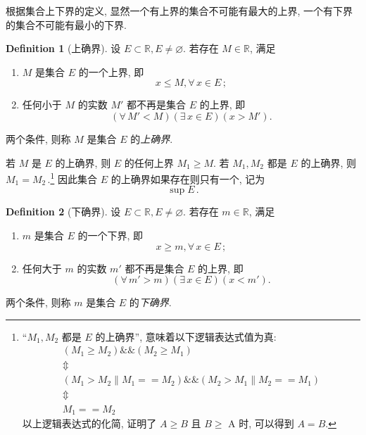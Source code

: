 \documentclass{book}
\renewcommand{\emptyset}{\varnothing}
\newcommand{\Exists}{\exists\,}
\newcommand{\Any}{\forall\,}
\numberwithin{equation}{section}
\numberwithin{figure}{section}
\theoremstyle{definition}
\newtheorem{definition}{Definition}
\newcommand{\dq}[1]{``#1''}
\begin{document}
根据集合上下界的定义, 显然一个有上界的集合不可能有最大的上界, 一个有下界的集合不可能有最小的下界.

\begin{definition}[上确界]
  设 $E\subset \mathbb{R}, E\neq \emptyset$. 若存在 $M\in \mathbb{R}$, 满足
  \begin{enumerate}
    \item $M$ 是集合 $E$ 的一个上界, 即
      \begin{equation*}
	x\leqslant M,\Any x\in E\,;
      \end{equation*}
    \item 任何小于 $M$ 的实数 $M'$ 都不再是集合 $E$ 的上界, 即
      \begin{equation*}
	(\Any M'<M)(\Exists x\in E)(x>M').
      \end{equation*}
  \end{enumerate}
  两个条件, 则称 $M$ 是集合 $E$ 的\emph{上确界}.
\end{definition}

若 $M$ 是 $E$ 的上确界, 则 $E$ 的任何上界 $M_1\geqslant M$. 若 $M_1,M_2$ 都是 $E$ 的上确界, 则 $M_1=M_2$\,.\footnote{\dq{$M_1,M_2$ 都是 $E$ 的上确界}, 意味着以下逻辑表达式值为真:
\begin{gather*}
  (M_1\geqslant M_2)\&\&(M_2\geqslant M_1)\\
  \Updownarrow\\
  (M_1>M_2\| M_1==M_2)\&\&(M_2>M_1\|M_2==M_1)\\
  \Updownarrow\\
  M_1==M_2
\end{gather*}
以上逻辑表达式的化简, 证明了 $A\geqslant B$ 且 $B\geqslant$ A 时, 可以得到 $A=B$.}
因此集合 $E$ 的上确界如果存在则只有一个, 记为
\begin{equation*}
  \sup E\,.
\end{equation*}

\begin{definition}[下确界]
  设 $E\subset \mathbb{R}, E\neq \emptyset$. 若存在 $m\in \mathbb{R}$, 满足
  \begin{enumerate}
    \item $m$ 是集合 $E$ 的一个下界, 即
      \begin{equation*}
	x\geqslant m,\Any x\in E\,;
      \end{equation*}
    \item 任何大于 $m$ 的实数 $m'$ 都不再是集合 $E$ 的上界, 即
      \begin{equation*}
	(\Any m'>m)(\Exists x\in E)(x<m').
      \end{equation*}
  \end{enumerate}
  两个条件, 则称 $m$ 是集合 $E$ 的\emph{下确界}.
\end{definition}
\end{document}
